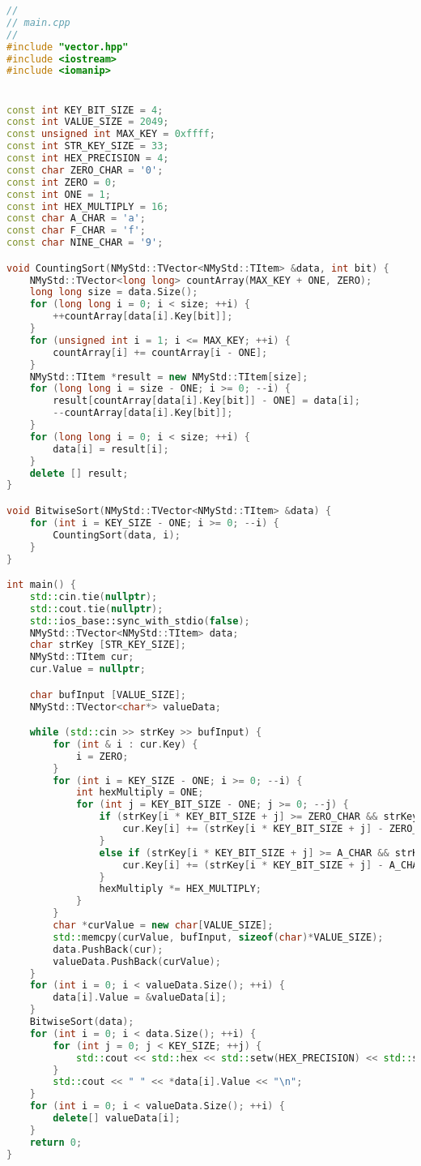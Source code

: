\begin{lstlisting}[language=C++]
//
// main.cpp
//
#include "vector.hpp"
#include <iostream>
#include <iomanip>


const int KEY_BIT_SIZE = 4;
const int VALUE_SIZE = 2049;
const unsigned int MAX_KEY = 0xffff;
const int STR_KEY_SIZE = 33;
const int HEX_PRECISION = 4;
const char ZERO_CHAR = '0';
const int ZERO = 0;
const int ONE = 1;
const int HEX_MULTIPLY = 16;
const char A_CHAR = 'a';
const char F_CHAR = 'f';
const char NINE_CHAR = '9';

void CountingSort(NMyStd::TVector<NMyStd::TItem> &data, int bit) {
    NMyStd::TVector<long long> countArray(MAX_KEY + ONE, ZERO);
    long long size = data.Size();
    for (long long i = 0; i < size; ++i) {
        ++countArray[data[i].Key[bit]];
    }
    for (unsigned int i = 1; i <= MAX_KEY; ++i) {
        countArray[i] += countArray[i - ONE];
    }
    NMyStd::TItem *result = new NMyStd::TItem[size];
    for (long long i = size - ONE; i >= 0; --i) {
        result[countArray[data[i].Key[bit]] - ONE] = data[i];
        --countArray[data[i].Key[bit]];
    }
    for (long long i = 0; i < size; ++i) {
        data[i] = result[i];
    }
    delete [] result;
}

void BitwiseSort(NMyStd::TVector<NMyStd::TItem> &data) {
    for (int i = KEY_SIZE - ONE; i >= 0; --i) {
        CountingSort(data, i);
    }
}

int main() {
    std::cin.tie(nullptr);
    std::cout.tie(nullptr);
    std::ios_base::sync_with_stdio(false);
    NMyStd::TVector<NMyStd::TItem> data;
    char strKey [STR_KEY_SIZE];
    NMyStd::TItem cur;
    cur.Value = nullptr;

    char bufInput [VALUE_SIZE];
    NMyStd::TVector<char*> valueData;

    while (std::cin >> strKey >> bufInput) {
        for (int & i : cur.Key) {
            i = ZERO;
        }
        for (int i = KEY_SIZE - ONE; i >= 0; --i) {
            int hexMultiply = ONE;
            for (int j = KEY_BIT_SIZE - ONE; j >= 0; --j) {
                if (strKey[i * KEY_BIT_SIZE + j] >= ZERO_CHAR && strKey[i * KEY_BIT_SIZE + j] <= NINE_CHAR) {
                    cur.Key[i] += (strKey[i * KEY_BIT_SIZE + j] - ZERO_CHAR) * hexMultiply;
                }
                else if (strKey[i * KEY_BIT_SIZE + j] >= A_CHAR && strKey[i * KEY_BIT_SIZE + j] <= F_CHAR) {
                    cur.Key[i] += (strKey[i * KEY_BIT_SIZE + j] - A_CHAR + 10) * hexMultiply;
                }
                hexMultiply *= HEX_MULTIPLY;
            }
        }
        char *curValue = new char[VALUE_SIZE];
        std::memcpy(curValue, bufInput, sizeof(char)*VALUE_SIZE);
        data.PushBack(cur);
        valueData.PushBack(curValue);
    }
    for (int i = 0; i < valueData.Size(); ++i) {
        data[i].Value = &valueData[i];
    }
    BitwiseSort(data);
    for (int i = 0; i < data.Size(); ++i) {
        for (int j = 0; j < KEY_SIZE; ++j) {
            std::cout << std::hex << std::setw(HEX_PRECISION) << std::setfill(ZERO_CHAR) << data[i].Key[j];
        }
        std::cout << " " << *data[i].Value << "\n";
    }
    for (int i = 0; i < valueData.Size(); ++i) {
        delete[] valueData[i];
    }
    return 0;
}
\end{lstlisting}

